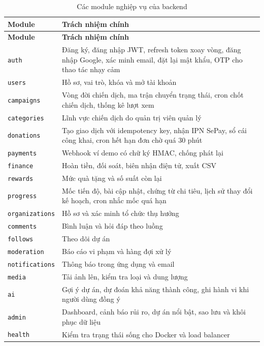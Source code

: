 \begin{longtable}{|P{3.2cm}|p{10.6cm}|}
    \caption{Các module nghiệp vụ của backend}
    \label{tab:module_backend} \\
    \hline
    \textbf{Module} & \textbf{Trách nhiệm chính} \\
    \hline
    \endfirsthead
    \hline
    \textbf{Module} & \textbf{Trách nhiệm chính} \\
    \hline
    \endhead
    \texttt{auth} & Đăng ký, đăng nhập JWT, refresh token xoay vòng, đăng nhập Google, xác minh email, đặt lại mật khẩu, OTP cho thao tác nhạy cảm \\
    \hline
    \texttt{users} & Hồ sơ, vai trò, khóa và mở tài khoản \\
    \hline
    \texttt{campaigns} & Vòng đời chiến dịch, ma trận chuyển trạng thái, cron chốt chiến dịch, thống kê lượt xem \\
    \hline
    \texttt{categories} & Lĩnh vực chiến dịch do quản trị viên quản lý \\
    \hline
    \texttt{donations} & Tạo giao dịch với idempotency key, nhận IPN SePay, sổ cái công khai, cron hết hạn đơn chờ quá 30 phút \\
    \hline
    \texttt{payments} & Webhook ví demo có chữ ký HMAC, chống phát lại \\
    \hline
    \texttt{finance} & Hoàn tiền, đối soát, biên nhận điện tử, xuất CSV \\
    \hline
    \texttt{rewards} & Mức quà tặng và số suất còn lại \\
    \hline
    \texttt{progress} & Mốc tiến độ, bài cập nhật, chứng từ chi tiêu, lịch sử thay đổi kế hoạch, cron nhắc mốc quá hạn \\
    \hline
    \texttt{organizations} & Hồ sơ và xác minh tổ chức thụ hưởng \\
    \hline
    \texttt{comments} & Bình luận và hỏi đáp theo luồng \\
    \hline
    \texttt{follows} & Theo dõi dự án \\
    \hline
    \texttt{moderation} & Báo cáo vi phạm và hàng đợi xử lý \\
    \hline
    \texttt{notifications} & Thông báo trong ứng dụng và email \\
    \hline
    \texttt{media} & Tải ảnh lên, kiểm tra loại và dung lượng \\
    \hline
    \texttt{ai} & Gợi ý dự án, dự đoán khả năng thành công, ghi hành vi khi người dùng đồng ý \\
    \hline
    \texttt{admin} & Dashboard, cảnh báo rủi ro, dự án nổi bật, sao lưu và khôi phục dữ liệu \\
    \hline
    \texttt{health} & Kiểm tra trạng thái sống cho Docker và load balancer \\
    \hline
\end{longtable}

